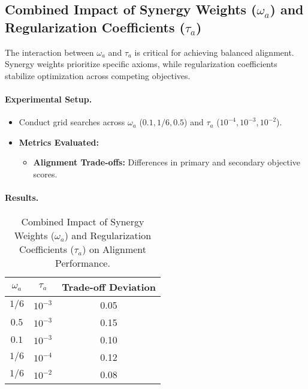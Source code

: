 \subsection{Combined Impact of Synergy Weights (\( \omega_a \)) and Regularization Coefficients (\( \tau_a \))}

The interaction between \( \omega_a \) and \( \tau_a \) is critical for achieving balanced alignment. Synergy weights prioritize specific axioms, while regularization coefficients stabilize optimization across competing objectives.

\paragraph{Experimental Setup.}
\begin{itemize}
    \item Conduct grid searches across \( \omega_a \) (\( 0.1, 1/6, 0.5 \)) and \( \tau_a \) (\( 10^{-4}, 10^{-3}, 10^{-2} \)).
    \item \textbf{Metrics Evaluated:}
    \begin{itemize}
        \item \textbf{Alignment Trade-offs:} Differences in primary and secondary objective scores.
    \end{itemize}
\end{itemize}

\paragraph{Results.}
\begin{table}[ht!]
\centering
\caption{Combined Impact of Synergy Weights (\( \omega_a \)) and Regularization Coefficients (\( \tau_a \)) on Alignment Performance.}
\label{tab:combined_ablation}
\begin{tabular}{|c|c|c|}
\hline
\textbf{\( \omega_a \)} & \textbf{\( \tau_a \)} & \textbf{Trade-off Deviation} \\ \hline
\( 1/6 \)               & \( 10^{-3} \)         & 0.05                         \\ 
\( 0.5 \)               & \( 10^{-3} \)         & 0.15                         \\ 
\( 0.1 \)               & \( 10^{-3} \)         & 0.10                         \\ 
\( 1/6 \)               & \( 10^{-4} \)         & 0.12                         \\ 
\( 1/6 \)               & \( 10^{-2} \)         & 0.08                         \\ \hline
\end{tabular}
\end{table}

